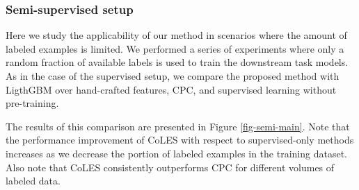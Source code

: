 \documentclass[sigconf, anonymous]{acmart}
\begin{document}
\subsubsection{Semi-supervised setup}

Here we study the applicability of our method in scenarios where the amount of labeled examples is limited. We performed a series of experiments where only a random fraction of available labels is used to train the downstream task models. As in the case of the supervised setup, we compare the proposed method with LigthGBM over hand-crafted features, CPC, and supervised learning without pre-training.

The results of this comparison are presented in Figure \ref{fig-semi-main}. Note that the performance improvement of CoLES with respect to supervised-only methods increases as we decrease the portion of labeled examples in the training dataset. Also note that CoLES consistently outperforms CPC for different volumes of labeled data.
\end{document}

